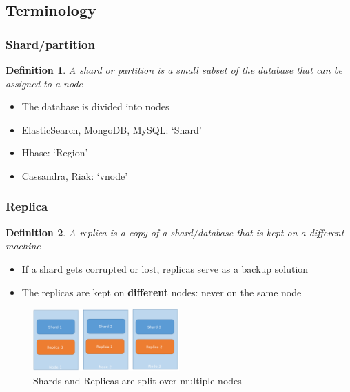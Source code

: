 \documentclass{article}
\newtheorem{theorem}{Definition}[section]
\begin{document}
\subsection{Terminology}

\subsubsection{Shard/partition}

\begin{theorem}
    A shard or partition is a small subset of the database that can be assigned to a node
\end{theorem}

\begin{itemize}
    \item The database is divided into nodes
    \item ElasticSearch, MongoDB, MySQL: `Shard'
    \item Hbase: `Region'
    \item Cassandra, Riak: `vnode'
\end{itemize}

\subsubsection{Replica}

\begin{theorem}
    A replica is a copy of a shard/database that is kept on a different machine
\end{theorem}

\begin{itemize}
    \item If a shard gets corrupted or lost, replicas serve as a backup solution
    \item The replicas are kept on \textbf{different} nodes: never on the same node
\end{itemize}

\begin{figure}[H]
    \centering
    \includegraphics[width=0.5\textwidth]{partitions-replicas-nodes.png}
    \caption{Shards and Replicas are split over multiple nodes}
\end{figure}
\end{document}
